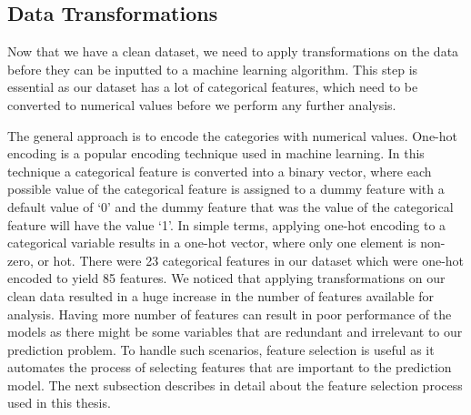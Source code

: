 \documentclass[11pt,openright]{report}
\begin{document}
\subsection {Data Transformations}
Now that we have a clean dataset, we need to apply transformations on the data before they can be inputted to a machine learning algorithm. This step is essential as our dataset has a lot of categorical features, which need to be converted to numerical values before we perform any further analysis. 

The general approach is to encode the categories with numerical values. One-hot encoding is a popular encoding technique used in machine learning. In this technique a categorical feature is converted into a binary vector, where each possible value of the categorical feature is assigned to a dummy feature with a default value of `0' and the dummy feature that was the value of the categorical feature will have the value `1'. In simple terms, applying one-hot encoding to a categorical variable results in a one-hot vector, where only one element is non-zero, or hot. There were 23 categorical features in our dataset which were one-hot encoded to yield 85 features. We noticed that applying transformations on our clean data resulted in a huge increase in the number of features available for analysis. Having more number of features can result in poor performance of the models as there might be some variables that are redundant and irrelevant to our prediction problem. To handle such scenarios, feature selection is useful as it automates the process of selecting features that are important to the prediction model. The next subsection describes in detail about the feature selection process used in this thesis.
\end{document}
